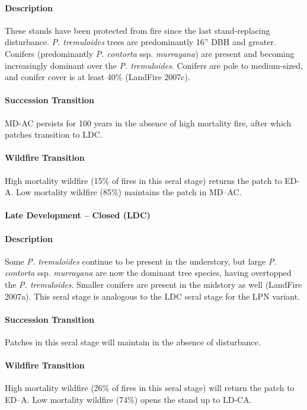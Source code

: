 \paragraph{Description} These stands have been protected from fire since the last stand-replacing disturbance. \emph{P. tremuloides} trees are predominantly 16'' DBH and greater. Conifers (predominantly \emph{P. contorta} ssp. \emph{murrayana}) are present and becoming increasingly dominant over the \emph{P. tremuloides}. Conifers are pole to medium-sized, and conifer cover is at least 40\% (LandFire 2007c).

\paragraph{Succession Transition} MD-AC persists for 100 years in the absence of high mortality fire, after which patches transition to LDC. 

\paragraph{Wildfire Transition} High mortality wildfire (15\% of fires in this seral stage) returns the patch to ED-A. Low mortality wildfire (85\%) maintains the patch in MD–AC.

\noindent\hrulefill

\paragraph{Late Development – Closed (LDC)}

\paragraph{Description} Some \emph{P. tremuloides} continue to be present in the understory, but large\emph{ P. contorta} ssp. \emph{murrayana} are now the dominant tree species, having overtopped the \emph{P. tremuloides}. Smaller conifers are present in the midstory as well (LandFire 2007a). This seral stage is analogous to the LDC seral stage for the LPN variant.

\paragraph{Succession Transition} Patches in this seral stage will maintain in the absence of disturbance.

\paragraph{Wildfire Transition} High mortality wildfire (26\% of fires in this seral stage) will return the patch to ED–A. Low mortality wildfire (74\%) opens the stand up to LD-CA.

